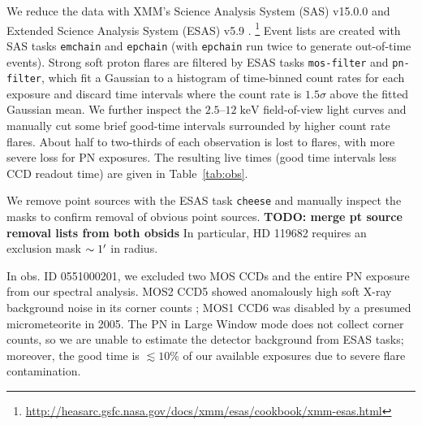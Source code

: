 \documentclass[preprint2,tighten,trackchanges]{aastex6}
\newcommand*{\mt}{\mathrm}
\newcommand*{\unit}[1]{\;\mt{#1}}  %
\begin{document}


We reduce the data with XMM's Science Analysis System (SAS) v15.0.0 and
Extended Science Analysis System (ESAS) v5.9 \citep{snowden2008, kuntz2008}.
\footnote{\href{http://heasarc.gsfc.nasa.gov/docs/xmm/esas/cookbook/xmm-esas.html}{http://heasarc.gsfc.nasa.gov/docs/xmm/esas/cookbook/xmm-esas.html}}
Event lists are created with SAS tasks \texttt{emchain} and \texttt{epchain}
(with \texttt{epchain} run twice to generate out-of-time events).
Strong soft proton flares are filtered by ESAS tasks \texttt{mos-filter} and
\texttt{pn-filter}, which fit a Gaussian to a histogram of time-binned count
rates for each exposure and discard time intervals where the count rate is
$1.5\sigma$ above the fitted Gaussian mean.  %
We further inspect the $2.5$--$12 \unit{keV}$ field-of-view light curves and
manually cut some brief good-time intervals surrounded by higher count rate
flares.
About half to two-thirds of each observation is lost to flares, with more
severe loss for PN exposures.
The resulting live times (good time intervals less CCD readout time) are
given in Table~\ref{tab:obs}.

We remove point sources with the ESAS task \texttt{cheese} and manually inspect
the masks to confirm removal of obvious point sources.
\textbf{TODO: merge pt source removal lists from both obsids}  %
In particular, HD 119682 requires an exclusion mask $\sim 1\mbox{$^\prime$}$ in radius.

In obs. ID 0551000201, we excluded two MOS CCDs and the entire PN exposure from
our spectral analysis.
MOS2 CCD5 showed anomalously high soft X-ray background noise in its corner
counts \citep[cf.][]{kuntz2008}; MOS1 CCD6 was disabled by a presumed
micrometeorite in 2005.
The PN in Large Window mode does not collect corner counts, so we are unable to
estimate the detector background from ESAS tasks; moreover, the good time is
$\lesssim 10\%$ of our available exposures due to severe flare contamination.
\end{document}
